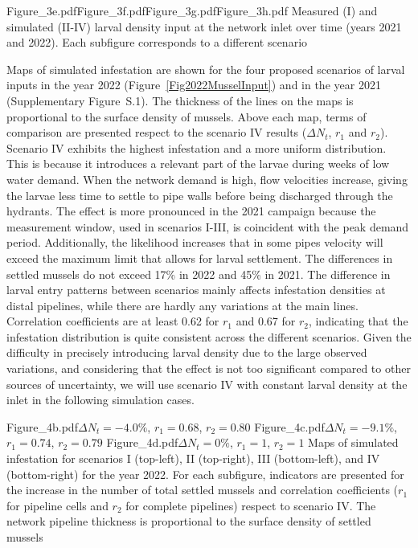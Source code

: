 \documentclass[review,authoryear]{elsarticle}
\begin{document}
{Figure_3e.pdf}{Figure_3f.pdf}{Figure_3g.pdf}{Figure_3h.pdf}
{Measured (I) and simulated (II-IV) larval density input at the network inlet
over time (years 2021 and 2022). Each subfigure corresponds to a different
scenario \label{FigMusselInput2022}}

Maps of simulated infestation are shown for the four proposed scenarios of
larval inputs in the year 2022 (Figure~\ref{Fig2022MusselInput}) and in the year
2021 (Supplementary Figure~S.1). The thickness of the lines on the maps is
proportional to the surface density of mussels. Above each map, terms of
comparison are presented respect to the scenario IV results ($\Delta N_t$, $r_1$
and $r_2$).
Scenario IV exhibits the
highest infestation and a more uniform distribution. This is because it
introduces a relevant part of the larvae during weeks of low water demand. When
the network demand is high, flow velocities increase, giving the larvae less
time to settle to pipe walls before being discharged through the hydrants.
The effect is more pronounced in the 2021 campaign because the measurement
window, used in scenarios I-III, is coincident with the peak demand period.
Additionally, the likelihood increases that in some pipes velocity will exceed
the maximum limit that allows for larval settlement. The differences in settled
mussels do not exceed 17\% in 2022 and 45\% in 2021. The difference in larval
entry patterns between scenarios mainly affects infestation densities at distal
pipelines, while there are hardly any variations at the main lines. Correlation
coefficients are at least 0.62 for $r_1$ and 0.67 for $r_2$, indicating that the
infestation distribution is quite consistent across the different scenarios.
Given the difficulty in precisely introducing larval density due to the large
observed variations, and considering that the effect is not too significant
compared to other sources of uncertainty, we will use scenario IV with constant
larval density at the inlet in the following simulation cases.

{Figure_4b.pdf}{$\Delta N_t=-4.0\%$, $r_1=0.68$, $r_2=0.80$}
{Figure_4c.pdf}{$\Delta N_t=-9.1\%$, $r_1=0.74$, $r_2=0.79$}
{Figure_4d.pdf}{$\Delta N_t=0\%$, $r_1=1$, $r_2=1$}
{Maps of simulated infestation for scenarios I (top-left), II (top-right), III
(bottom-left), and IV (bottom-right) for the year 2022. For each subfigure,
indicators are presented for the increase in the number of total settled mussels
and correlation coefficients ($r_1$ for pipeline cells and $r_2$ for complete
pipelines) respect to scenario IV. The network pipeline thickness is
proportional to the surface density of settled
mussels\label{Fig2022MusselInput}}
\end{document}
